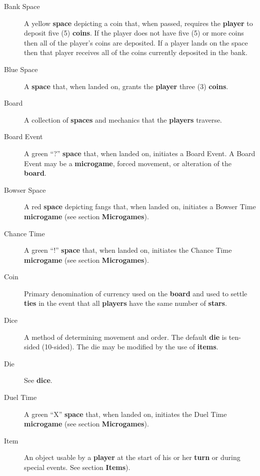 \documentclass{article}
\begin{document}
\begin{description}
\item[Bank Space] A yellow \textbf{space} depicting a coin that,
when passed, requires the \textbf{player} to deposit five (5) \textbf{coins}.
If the player does not have five (5) or more coins then all of the player's
coins are deposited.  If a player lands on the space then that player
receives all of the coins currently deposited in the bank.

\item[Blue Space] A \textbf{space} that, when landed on, grants the
\textbf{player} three (3) \textbf{coins}.

\item[Board] A collection of \textbf{spaces} and mechanics that the
\textbf{players} traverse.

\item[Board Event] A green ``?'' \textbf{space} that, when landed on,
initiates a Board Event.  A Board Event may be a \textbf{microgame},
forced movement, or alteration of the \textbf{board}.

\item[Bowser Space] A red \textbf{space} depicting fangs that,
when landed on, initiates a Bowser Time \textbf{microgame} (see
section \textbf{Microgames}).

\item[Chance Time] A green ``!'' \textbf{space} that, when landed on,
initiates the Chance Time \textbf{microgame} (see section
\textbf{Microgames}).

\item[Coin] Primary denomination of currency used on the \textbf{board}
and used to settle \textbf{ties} in the event that all \textbf{players}
have the same number of \textbf{stars}.

\item[Dice] A method of determining movement and order. The default
\textbf{die} is ten-sided (10-sided).  The die may be modified by the
use of \textbf{items}.

\item[Die] See \textbf{dice}.

\item[Duel Time] A green ``X'' \textbf{space} that, when landed on,
initiates the Duel Time \textbf{microgame} (see section \textbf{Microgames}).

\item[Item] An object usable by a \textbf{player} at the start of
his or her \textbf{turn} or during special events. See section \textbf{Items}).


\end{description}
\end{document}
